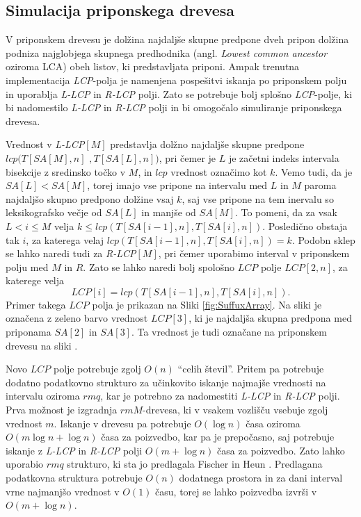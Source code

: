\subsection{Simulacija priponskega drevesa}\label{sec:STsimulacija}
V priponskem drevesu je dolžina najdaljše skupne predpone dveh pripon dolžina podniza najglobjega skupnega predhodnika (angl. \textit{Lowest common ancestor} oziroma LCA) obeh listov, ki predstavljata priponi. Ampak trenutna implementacija \textit{LCP}-polja je namenjena pospešitvi iskanja po priponskem polju in uporablja \textit{L-LCP} in \textit{R-LCP} polji. Zato se potrebuje bolj splošno \textit{LCP}-polje, ki bi nadomestilo \textit{L-LCP} in \textit{R-LCP} polji in bi omogočalo simuliranje priponskega drevesa.

Vrednost v \textit{L-LCP}$[M]$ predstavlja dolžno najdaljše skupne predpone $lcp(T[SA[M], n]$ $,T[SA[L], n])$, pri čemer je $L$ je začetni indeks intervala bisekcije z sredinsko točko v $M$, in $lcp$ vrednost označimo kot $k$. Vemo tudi, da je $SA[L]<SA[M]$, torej imajo vse pripone na intervalu med $L$ in $M$ paroma najdaljšo skupno predpono dolžine vsaj $k$, saj vse pripone na tem inervalu so leksikografsko večje od $SA[L]$ in manjše od $SA[M]$. To pomeni, da za vsak $L<i\le M$ velja $k\le lcp(T[SA[i-1], n], T[SA[i], n])$. Posledično obstaja tak $i$, za katerega velaj $lcp(T[SA[i-1], n], T[SA[i], n])=k$. Podobn sklep se lahko naredi tudi za \textit{R-LCP}$[M]$, pri čemer uporabimo interval v priponskem polju med $M$ in $R$. Zato se lahko naredi bolj spološno $LCP$ polje $LCP[2,n]$, za katerege velja
$$
    LCP[i]=lcp(T[SA[i-1], n], T[SA[i], n]).
$$
Primer takega $LCP$ polja je prikazan na Sliki \ref{fig:SuffuxArray}. Na sliki je označena z zeleno barvo vrednost $LCP[3]$, ki je najdaljša skupna predpona med priponama $SA[2]$ in $SA[3]$. Ta vrednost je tudi označane na priponskem drevesu na sliki \cite{Abouelhoda2004, Kasai2001}.

Novo $LCP$ polje potrebuje zgolj $O(n)$ \enquote{celih števil}. Pritem pa potrebuje dodatno podatkovno strukturo za učinkovito iskanje najmajše vrednosti na intervalu oziroma $rmq$, kar je potrebno za nadomestiti \textit{L-LCP} in \textit{R-LCP} polji. Prva možnost je izgradnja $rmM$-drevesa, ki v vsakem vozlišču vsebuje zgolj vrednost $m$. Iskanje v drevesu pa potrebuje $O(\log{n})$ časa oziroma $O(m\log{n}+\log{n})$ časa za poizvedbo, kar pa je prepočasno, saj potrebuje iskanje z \textit{L-LCP} in \textit{R-LCP} polji $O(m+\log{n})$ časa za poizvedbo. Zato lahko uporabio $rmq$ strukturo, ki sta jo predlagala Fischer in Heun \cite{Fischer2007}. Predlagana podatkovna struktura potrebuje $O(n)$ dodatnega prostora in za dani interval vrne najmanjšo vrednost v $O(1)$ času, torej se lahko poizvedba izvrši v $O(m+\log{n})$.

